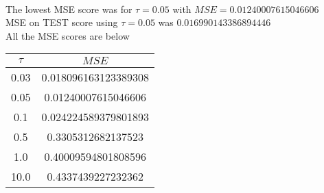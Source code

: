 \begin{answer}\\
The lowest MSE score was for $\tau=0.05$ with $MSE=0.01240007615046606$\\
MSE on TEST score using $\tau=0.05$ was $0.016990143386894446$\\
All the MSE scores are below
\begin{center}
\begin{tabular}{ |c|c| } 
 \hline
 $\tau$ & $MSE$ \\ 
 \hline
 0.03 & 0.018096163123389308 \\
 0.05 & 0.01240007615046606 \\
 0.1 & 0.024224589379801893 \\
 0.5 & 0.3305312682137523 \\
 1.0 & 0.40009594801808596 \\
 10.0 & 0.4337439227232362 \\ \hline
\end{tabular}
\end{center}
\end{answer}
